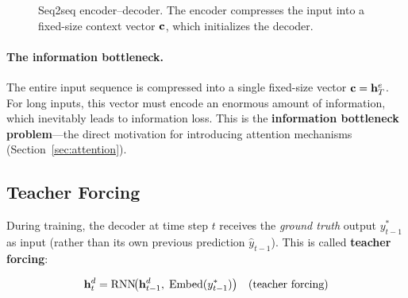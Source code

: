 \begin{figure}[H]
\caption{Seq2seq encoder--decoder.  The encoder compresses the input into
a fixed-size context vector $\mathbf{c}$, which initializes the decoder.}
\label{fig:seq2seq}
\end{figure}

\paragraph{The information bottleneck.}
The entire input sequence is compressed into a single fixed-size vector
$\mathbf{c} = \mathbf{h}_T^e$.  For long inputs, this vector must encode an enormous
amount of information, which inevitably leads to information loss.  This
is the \textbf{information bottleneck problem}---the direct motivation for
introducing attention mechanisms (Section~\ref{sec:attention}).

\subsection{Teacher Forcing}

During training, the decoder at time step $t$ receives the \emph{ground
truth} output $y_{t-1}^*$ as input (rather than its own previous
prediction $\hat{y}_{t-1}$).  This is called \textbf{teacher forcing}:

\begin{equation}
\mathbf{h}_t^d = \text{RNN}\!\bigl(\mathbf{h}_{t-1}^d,\; \text{Embed}(y_{t-1}^*)\bigr)
\quad \text{(teacher forcing)}
\end{equation}

